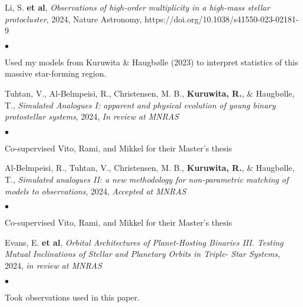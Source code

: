 \documentclass[margin,line]{res}
\newenvironment{list1}{
	\begin{list}{\ding{113}}{%
			\setlength{\itemsep}{0in}
			\setlength{\parsep}{0in} \setlength{\parskip}{0in}
			\setlength{\topsep}{0in} \setlength{\partopsep}{0in} 
			\setlength{\leftmargin}{0.17in}}}{\end{list}}
\newenvironment{list2}{
	\begin{list}{$\bullet$}{%
			\setlength{\itemsep}{0in}
			\setlength{\parsep}{0in} \setlength{\parskip}{0in}
			\setlength{\topsep}{0in} \setlength{\partopsep}{0in} 
			\setlength{\leftmargin}{0.2in}}}{\end{list}}
\begin{document}
\begin{resume}
\begin{list1}
 \item[]{Li, S. {\bf et al}}, \emph{Observations of high-order multiplicity in a high-mass stellar protocluster}, 2024, Nature Astronomy, https://doi.org/10.1038/s41550-023-02181-9
 \begin{list2}
\item Used my models from Kuruwita \& Haugb{\o}lle (2023) to interpret statistics of this massive star-forming region.\\
\end{list2}

\item[]{Tuhtan, V., Al-Belmpeisi, R., Christensen, M. B., {\bf Kuruwita, R.}, \& Haugb{\o}lle, T.}, \emph{Simulated Analogues I: apparent and physical evolution of young binary protostellar systems}, 2024, \emph{In review at MNRAS}
	\begin{list2}
		\item Co-supervised Vito, Rami, and Mikkel for their Master's thesis\\
	\end{list2}

\item[]{Al-Belmpeisi, R., Tuhtan, V., Christensen, M. B., {\bf Kuruwita, R.}, \& Haugb{\o}lle, T.}, \emph{Simulated analogues II: a new methodology for non-parametric matching
of models to observations}, 2024, \emph{Accepted at MNRAS}
	\begin{list2}
		\item Co-supervised Vito, Rami, and Mikkel for their Master's thesis\\
	\end{list2}

 \item[]{Evans, E. {\bf et al}}, \emph{Orbital Architectures of Planet-Hosting Binaries III. Testing Mutual Inclinations of Stellar and Planetary Orbits in Triple-
Star Systems}, 2024, \emph{in review at MNRAS}
 \begin{list2}
\item Took observations used in this paper.\\
\end{list2}


\end{list1}
\end{resume}
\end{document}
